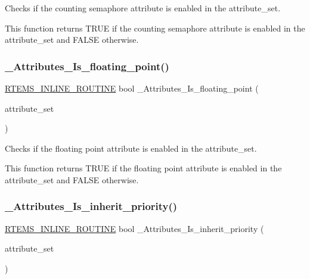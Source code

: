 Checks if the counting semaphore attribute is enabled in the attribute\+\_\+set. 

This function returns T\+R\+UE if the counting semaphore attribute is enabled in the attribute\+\_\+set and F\+A\+L\+SE otherwise. \mbox{\label{group__ClassicAttributesImpl_ga0dfdabdcfadce52be0fd8ca48831c234}} 
\subsubsection{\texorpdfstring{\_Attributes\_Is\_floating\_point()}{\_Attributes\_Is\_floating\_point()}}
{\footnotesize\ttfamily \mbox{\hyperlink{group__RTEMSScoreBaseDefs_gac216239df231d5dbd15e3520b0b9313f}{R\+T\+E\+M\+S\+\_\+\+I\+N\+L\+I\+N\+E\+\_\+\+R\+O\+U\+T\+I\+NE}} bool \+\_\+\+Attributes\+\_\+\+Is\+\_\+floating\+\_\+point (\begin{DoxyParamCaption}\item[{\mbox{\hyperlink{group__ClassicAttributes_gaea40313cf78ed843e09c4315d0a10f79}{rtems\+\_\+attribute}}}]{attribute\+\_\+set }\end{DoxyParamCaption})}



Checks if the floating point attribute is enabled in the attribute\+\_\+set. 

This function returns T\+R\+UE if the floating point attribute is enabled in the attribute\+\_\+set and F\+A\+L\+SE otherwise. \mbox{\label{group__ClassicAttributesImpl_ga1a916295ab386150a3afcce8259e11a4}} 
\subsubsection{\texorpdfstring{\_Attributes\_Is\_inherit\_priority()}{\_Attributes\_Is\_inherit\_priority()}}
{\footnotesize\ttfamily \mbox{\hyperlink{group__RTEMSScoreBaseDefs_gac216239df231d5dbd15e3520b0b9313f}{R\+T\+E\+M\+S\+\_\+\+I\+N\+L\+I\+N\+E\+\_\+\+R\+O\+U\+T\+I\+NE}} bool \+\_\+\+Attributes\+\_\+\+Is\+\_\+inherit\+\_\+priority (\begin{DoxyParamCaption}\item[{\mbox{\hyperlink{group__ClassicAttributes_gaea40313cf78ed843e09c4315d0a10f79}{rtems\+\_\+attribute}}}]{attribute\+\_\+set }\end{DoxyParamCaption})}



